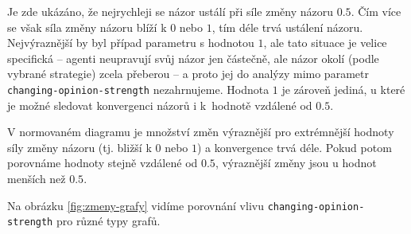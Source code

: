 \documentclass[10pt,a4paper]{report}
\begin{document}
Je zde ukázáno, že nejrychleji se názor ustálí při síle změny názoru $0.5$. Čím více se však síla změny názoru blíží k $0$ nebo $1$, tím déle trvá ustálení názoru. Nejvýraznější by byl případ parametru s hodnotou $1$, ale tato situace je velice specifická -- agenti neupravují svůj názor jen částečně, ale názor okolí (podle vybrané strategie) zcela přeberou -- a proto jej do analýzy mimo parametr \texttt{changing-opinion-strength} nezahrnujeme. Hodnota $1$ je zároveň jediná, u které je možné sledovat konvergenci názorů i k~hodnotě vzdálené od $0.5$.

V normovaném diagramu je množství změn výraznější pro extrémnější hodnoty síly změny názoru (tj. bližší k $0$ nebo $1$) a konvergence trvá déle. Pokud potom porovnáme hodnoty stejně vzdálené od $0.5$, výraznější změny jsou u hodnot menších než $0.5$. 

Na obrázku \ref{fig:zmeny-grafy} vidíme porovnání vlivu \texttt{changing-opinion-strength} pro různé typy grafů.
\end{document}
